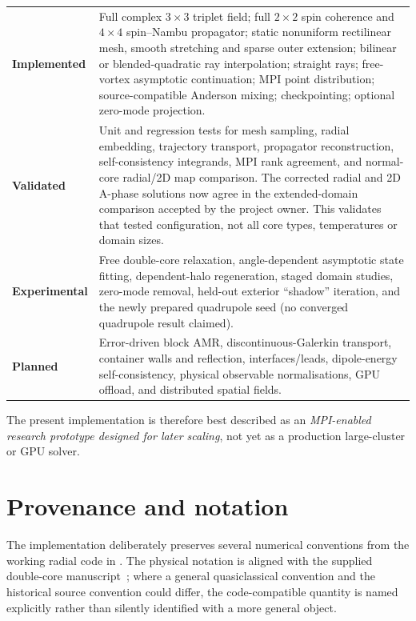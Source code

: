 \documentclass[11pt,a4paper]{article}
\newcommand{\code}[1]{\texttt{\detokenize{#1}}}
\newcommand{\status}[2]{\textcolor{#1}{\textsf{\bfseries #2}}}
\begin{document}
\begin{tabularx}{\textwidth}{>{\raggedright\arraybackslash}p{27mm}X}
\toprule
\status{FFTeal}{Implemented} & Full complex $3\times3$ triplet field; full
$2\times2$ spin coherence and $4\times4$ spin--Nambu propagator; static
nonuniform rectilinear mesh, smooth stretching and sparse outer extension;
bilinear or blended-quadratic ray interpolation; straight rays; free-vortex
asymptotic continuation; MPI point distribution; source-compatible Anderson
mixing; checkpointing; optional zero-mode projection.\\
\status{FFBlue}{Validated} & Unit and regression tests for mesh sampling,
radial embedding, trajectory transport, propagator reconstruction,
self-consistency integrands, MPI rank agreement, and normal-core radial/2D map
comparison. The corrected radial and 2D A-phase solutions now agree in the
extended-domain comparison accepted by the project owner. This validates that
tested configuration, not all core types, temperatures or domain sizes.\\
\status{FFOrange}{Experimental} & Free double-core relaxation, angle-dependent
asymptotic state fitting, dependent-halo regeneration, staged domain studies,
zero-mode removal, held-out exterior ``shadow'' iteration, and the newly
prepared quadrupole seed (no converged quadrupole result claimed).\\
\status{FFRed}{Planned} & Error-driven block AMR, discontinuous-Galerkin
transport, container walls and reflection, interfaces/leads, dipole-energy
self-consistency, physical observable normalisations, GPU offload, and
distributed spatial fields.\\
\bottomrule
\end{tabularx}

The present implementation is therefore best described as an
\emph{MPI-enabled research prototype designed for later scaling}, not yet as a
production large-cluster or GPU solver.

\section{Provenance and notation}

The implementation deliberately preserves several numerical conventions from
the working radial code in \code{new_src}.  The physical notation is aligned
with the supplied double-core manuscript~\cite{dcvlong}; where a general
quasiclassical convention and the historical source convention could differ,
the code-compatible quantity is named explicitly rather than silently
identified with a more general object.
\end{document}
